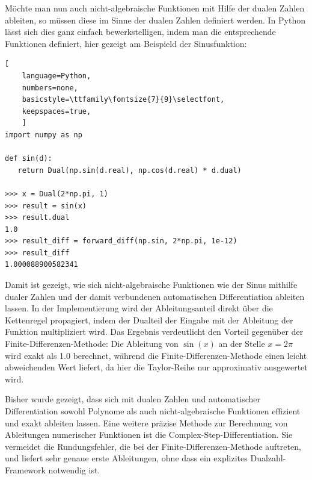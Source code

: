 Möchte man nun auch nicht-algebraische Funktionen mit Hilfe der dualen Zahlen ableiten, so müssen diese im Sinne der dualen Zahlen definiert werden. In Python lässt sich dies ganz einfach bewerkstelligen, indem man die entsprechende Funktionen definiert, hier gezeigt am Beispield der Sinusfunktion: 
\begin{lstlisting}[
	language=Python,
	numbers=none,
	basicstyle=\ttfamily\fontsize{7}{9}\selectfont,
	keepspaces=true,
	]
import numpy as np

def sin(d):
   return Dual(np.sin(d.real), np.cos(d.real) * d.dual)
  
>>> x = Dual(2*np.pi, 1)
>>> result = sin(x)
>>> result.dual
1.0
>>> result_diff = forward_diff(np.sin, 2*np.pi, 1e-12)
>>> result_diff
1.000088900582341
\end{lstlisting}
Damit ist gezeigt, wie sich nicht-algebraische Funktionen wie der Sinus mithilfe dualer Zahlen und der damit verbundenen automatischen Differentiation ableiten lassen.
In der Implementierung wird der Ableitungsanteil direkt über die Kettenregel propagiert, indem der Dualteil der Eingabe mit der Ableitung der Funktion multipliziert wird.
Das Ergebnis verdeutlicht den Vorteil gegenüber der Finite-Differenzen-Methode: Die Ableitung von $\sin(x)$ an der Stelle $x = 2\pi$ wird exakt als 1.0 berechnet, während die Finite-Differenzen-Methode einen leicht abweichenden Wert liefert, da hier die Taylor-Reihe nur approximativ ausgewertet wird. 

Bisher wurde gezeigt, dass sich mit dualen Zahlen und automatischer Differentiation sowohl Polynome als auch nicht-algebraische Funktionen effizient und exakt ableiten lassen.
Eine weitere präzise Methode zur Berechnung von Ableitungen numerischer Funktionen ist die Complex-Step-Differentiation.
Sie vermeidet die Rundungsfehler, die bei der Finite-Differenzen-Methode auftreten, und liefert sehr genaue erste Ableitungen, ohne dass ein explizites Dualzahl-Framework notwendig ist.
